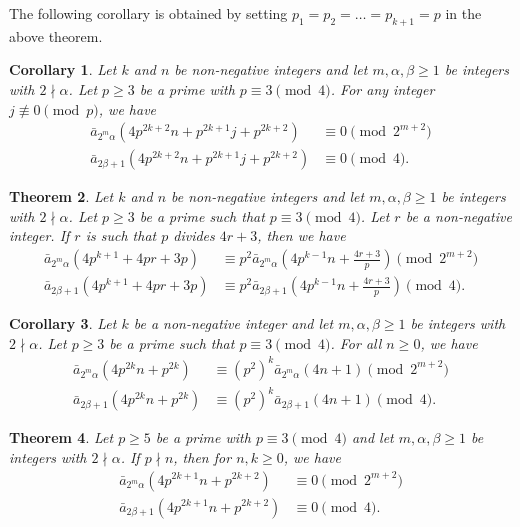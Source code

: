 \documentclass[11pt,a4paper]{article}
\numberwithin{equation}{section}
\theoremstyle{plain}
\newtheorem{theorem}{Theorem}[section]
\newtheorem{corollary}[theorem]{Corollary}
\begin{document}
	The following corollary is obtained by setting $p_1=p_2=\dots=p_{k+1}=p$ in the above theorem.
	\begin{corollary}
	Let $k$ and $n$ be non-negative integers and let $m, \alpha,\beta\ge 1$ be integers with $2\nmid\alpha$. Let $p\ge 3$ be a prime with $p\equiv 3\pmod 4$. For any integer $j\not\equiv0\pmod p$, we have
	\begin{align*}
	\bar{a}_{2^m\alpha}\left(4p^{2k+2}n+p^{2k+1}j+p^{2k+2}\right)&\equiv 0\pmod {2^{m+2}}\\
	\bar{a}_{2\beta+1}\left(4p^{2k+2}n+p^{2k+1}j+p^{2k+2}\right)&\equiv 0\pmod {4}.
	\end{align*}
	\end{corollary}
	\begin{theorem}\label{t4n1t1}
	Let $k$ and $n$ be non-negative integers and let $m, \alpha,\beta\ge 1$ be integers with $2\nmid\alpha$. Let $p\ge 3$ be a prime such that $p\equiv 3\pmod 4$. Let $r$ be a non-negative integer. If $r$ is such that $p$ divides $4r+3$, then we have
	\begin{align*}
		\bar{a}_{2^m\alpha}(4p^{k+1}+4pr+3p)&\equiv p^2 \bar{a}_{2^m\alpha}\left(4p^{k-1}n+\frac{4r+3}{p}\right)\pmod{2^{m+2}}\\
		\bar{a}_{2\beta+1}(4p^{k+1}+4pr+3p)&\equiv p^2 \bar{a}_{2\beta+1}\left(4p^{k-1}n+\frac{4r+3}{p}\right)\pmod{4}.
	\end{align*}
	\end{theorem}
	\begin{corollary}\label{c4n12}
		Let $k$ be a non-negative integer and let $m, \alpha,\beta\ge 1$ be integers with $2\nmid\alpha$. Let $p\ge 3$ be a prime such that $p\equiv 3\pmod 4$. For all $n\ge 0$, we have
		\begin{align*}
			\bar{a}_{2^m\alpha}(4p^{2k}n+p^{2k})&\equiv (p^2)^k\bar{a}_{2^m\alpha}(4n+1)\pmod{2^{m+2}}\\
			\bar{a}_{2\beta+1}(4p^{2k}n+p^{2k})&\equiv (p^2)^k\bar{a}_{2\beta+1}(4n+1)\pmod{4}.
		\end{align*}
	\end{corollary}
	\begin{theorem}\label{t4n1}
	Let $p\ge 5$ be a prime with $p\equiv 3\pmod 4$ and let $m, \alpha,\beta\ge 1$ be integers with $2\nmid\alpha$. If $p\nmid n$, then for $n,k\ge 0$, we have
	\begin{align*}
	\bar{a}_{2^m\alpha}\left(4p^{2k+1}n+p^{2k+2}\right)&\equiv 0\pmod {2^{m+2}}\\
	\bar{a}_{2\beta+1}\left(4p^{2k+1}n+p^{2k+2}\right)&\equiv 0\pmod {4}.
	\end{align*}
	\end{theorem}
\end{document}

